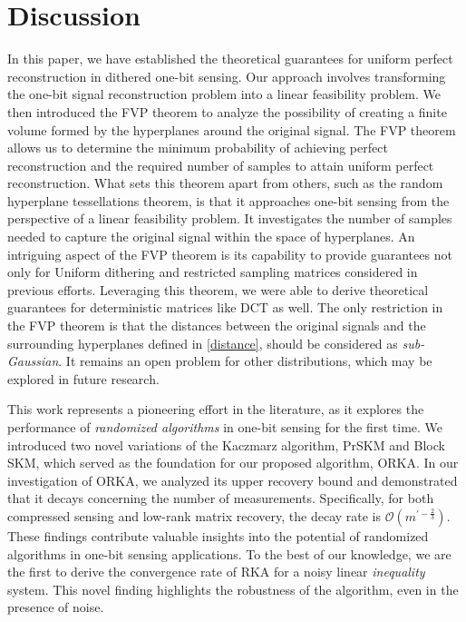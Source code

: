 \documentclass[12pt,draftcls,onecolumn]{IEEEtran}
\begin{document}
\section{Discussion}
In this paper, we have established the theoretical guarantees for uniform perfect reconstruction in dithered one-bit sensing. Our approach involves transforming the one-bit signal reconstruction problem into a linear feasibility problem. We then introduced the FVP theorem to analyze the possibility of creating a finite volume formed by the hyperplanes around the original signal.
The FVP theorem allows us to determine the minimum probability of achieving perfect reconstruction and the required number of samples to attain uniform perfect reconstruction. What sets this theorem apart from others, such as the random hyperplane tessellations theorem, is that it approaches one-bit sensing from the perspective of a linear feasibility problem. It investigates the number of samples needed to capture the original signal within the space of hyperplanes.
An intriguing aspect of the FVP theorem is its capability to provide guarantees not only for Uniform dithering and restricted sampling matrices considered in previous efforts. Leveraging this theorem, we were able to derive theoretical guarantees for deterministic matrices like DCT as well. The only restriction in the FVP theorem is that the distances between the original signals and the surrounding hyperplanes defined in \eqref{distance}, should be considered as \emph{sub-Gaussian}. It remains an open problem for other distributions, which may be explored in future research. 

This work represents a pioneering effort in the literature, as it explores the performance of \emph{randomized algorithms} in one-bit sensing for the first time. We introduced two novel variations of the Kaczmarz algorithm, PrSKM and Block SKM, which served as the foundation for our proposed algorithm, ORKA.
In our investigation of ORKA, we analyzed its upper recovery bound and demonstrated that it decays concerning the number of measurements. Specifically, for both compressed sensing and low-rank matrix recovery, the decay rate is $\mathcal{O}\left(m^{\prime-\frac{2}{3}}\right)$. These findings contribute valuable insights into the potential of randomized algorithms in one-bit sensing applications. 
To the best of our knowledge, we are the first to derive the convergence rate of RKA for a noisy linear \emph{inequality} system. This novel finding highlights the robustness of the algorithm, even in the presence of noise.
\end{document}
